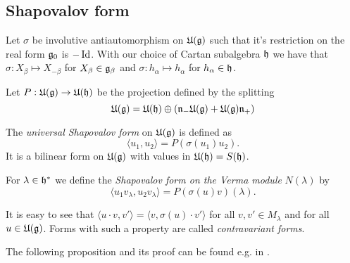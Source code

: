 \subsection{Shapovalov form}

Let $\sigma$ be involutive antiautomorphism on $\mathfrak{U(g)}$ such that it's restriction on the real form $\mathfrak{g}_0$ is $-\operatorname{\mathrm{Id}}$. With our choice of Cartan subalgebra $\mathfrak{h}$ we have that $\sigma: X_\beta \mapsto X_{-\beta}$ for $X_\beta \in \mathfrak{g}_\beta$ and $\sigma: h_\alpha \mapsto h_\alpha$ for $h_\alpha \in \mathfrak{h}$.

Let $P: \mathfrak{U(g)} \to \mathfrak{U(h)}$ be the projection defined by the splitting \[\mathfrak{U(g)} = \mathfrak{U(h)}\oplus \left( \mathfrak{n_-U(g)} + \mathfrak{U(g)n_+} \right)\]

\begin{definition}
  The \emph{universal Shapovalov form} on $\mathfrak{U(g)}$ is defined as \[\langle u_1 , u_2 \rangle = P(\sigma(u_1)u_2).\] It is a bilinear form on $\mathfrak{U(g)}$ with values in $\mathfrak{U(h)} = S(\mathfrak{h})$.

  For $\lambda\in\mathfrak{h}^*$ we define the \emph{Shapovalov form on the Verma module} $N(\lambda)$ by \[\langle u_1 v_\lambda , u_2 v_\lambda \rangle = P(\sigma(u)v)(\lambda).\]
\end{definition}

It is easy to see that $\langle u\cdot v,v' \rangle = \langle v,\sigma(u)\cdot v' \rangle$ for all $v,v'\in M_\lambda$ and for all $u\in \mathfrak{U(g)}$. Forms with such a property are called \emph{contravariant forms}.

The following proposition and its proof can be found e.g. in \cite{humphreys_representations_2008}.

